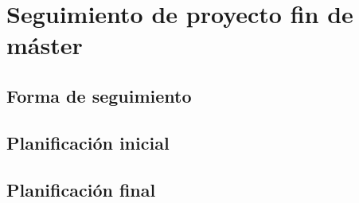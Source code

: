 \documentclass[12pt,a4paper,onecolumn,oneside]{report}
\begin{document}
\chapter{Seguimiento de proyecto fin de máster}
\label{Seguimiento de proyecto fin de máster}


\section{Forma de seguimiento}

\section{Planificación inicial}

\section{Planificación final}
\end{document}
